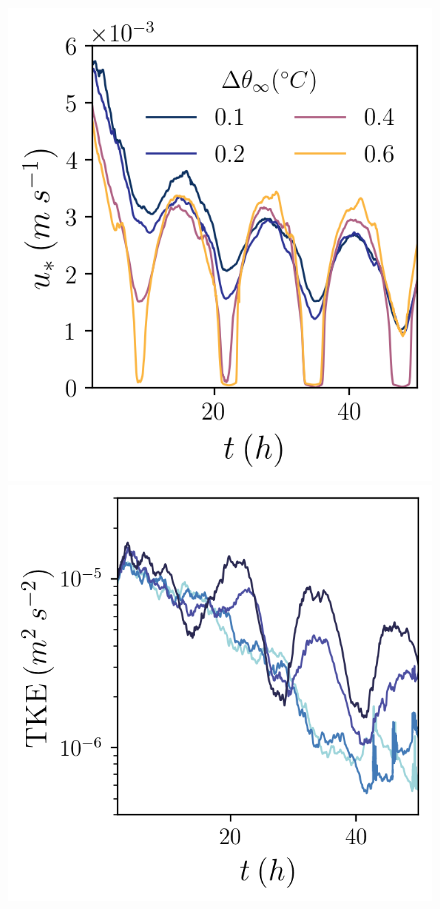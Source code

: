 \documentclass[draft]{agujournal2019}
\begin{document}
\begin{figure}[h!]
\begin{minipage}{0.33\textwidth}
    \end{minipage}%
    \begin{minipage}{0.33\textwidth}
        \includegraphics[trim={0 0 0 0},clip,width=\textwidth]{Figures/us_cmp_dT_t.png}
    \end{minipage}
    \begin{minipage}{0.33\textwidth}
        \includegraphics[trim={0 0 0 0},clip,width=\textwidth]{Figures/tke_cmp_dslope_t.png}

\end{minipage}
\end{figure}
\end{document}
